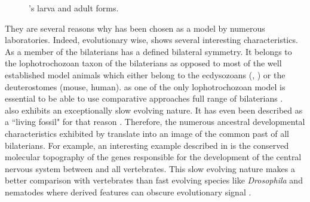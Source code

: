      
\begin{figure}[bth]
        \myfloatalign
         \quad
        \caption{\platyfull{}'s larva and adult forms.}\label{fig:platynereis}
\end{figure}
     
     They are several reasons why \platy{} has been chosen as a model by numerous laboratories. Indeed, evolutionary wise, \platy{} shows several interesting characteristics.  As a member of the bilaterians \platy{} has a defined bilateral symmetry. It belongs to the lophotrochozoan taxon of the bilaterians as opposed to most of the well established model animals which either belong to the ecdysozoans (, ) or the deuterostomes (mouse, human). \platy{} as one of the only lophotrochozoan model is essential to be able to use comparative approaches full range of bilaterians \cite{Fischer10}.\\
     
     \platy{} also exhibits an exceptionally slow evolving nature. It has even been described as a ``living fossil" for that reason \cite{Fischer10}. Therefore, the numerous ancestral developmental characteristics exhibited by \platy{} translate into an image of the common past of all bilaterians. For example, an interesting example described in \cite{denes07,tessmar07} is the conserved molecular topography of the genes responsible for the development of the central nervous system between \platy{} and all vertebrates. This slow evolving nature makes \platy{} a better comparison with vertebrates than fast evolving species like \emph{Drosophila} and nematodes where derived features can obscure evolutionary signal \cite{Fischer10,arendt124}.\\
     
